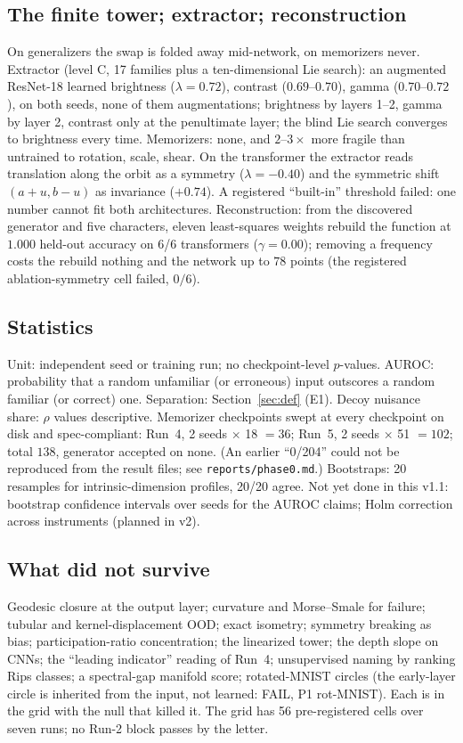 \documentclass[11pt]{article}
\begin{document}
\subsection{The finite tower; extractor; reconstruction}
On generalizers the swap is folded away mid-network, on memorizers never. Extractor (level C, 17 families plus a ten-dimensional Lie search): an augmented ResNet-18 learned brightness ($\lambda=0.72$), contrast ($0.69$--$0.70$), gamma ($0.70$--$0.72$), on both seeds, none of them augmentations; brightness by layers 1--2, gamma by layer 2, contrast only at the penultimate layer; the blind Lie search converges to brightness every time. Memorizers: none, and $2$--$3\times$ more fragile than untrained to rotation, scale, shear. On the transformer the extractor reads translation along the orbit as a symmetry ($\lambda=-0.40$) and the symmetric shift $(a+u,b-u)$ as invariance ($+0.74$). A registered ``built-in'' threshold failed: one number cannot fit both architectures. Reconstruction: from the discovered generator and five characters, eleven least-squares weights rebuild the function at $1.000$ held-out accuracy on 6/6 transformers ($\gamma=0.00$); removing a frequency costs the rebuild nothing and the network up to $78$ points (the registered ablation-symmetry cell failed, $0/6$).

\subsection{Statistics}\label{sec:recon}
Unit: independent seed or training run; no checkpoint-level $p$-values. AUROC: probability that a random unfamiliar (or erroneous) input outscores a random familiar (or correct) one. Separation: Section~\ref{sec:def} (E1). Decoy nuisance share: $\rho$ values descriptive. Memorizer checkpoints swept at every checkpoint on disk and spec-compliant: Run~4, 2 seeds $\times$ 18 $=36$; Run~5, 2 seeds $\times$ 51 $=102$; total $138$, generator accepted on none. (An earlier ``0/204'' could not be reproduced from the result files; see \texttt{reports/phase0.md}.) Bootstraps: 20 resamples for intrinsic-dimension profiles, 20/20 agree. Not yet done in this v1.1: bootstrap confidence intervals over seeds for the AUROC claims; Holm correction across instruments (planned in v2).

\subsection{What did not survive}
Geodesic closure at the output layer; curvature and Morse--Smale for failure; tubular and kernel-displacement OOD; exact isometry; symmetry breaking as bias; participation-ratio concentration; the linearized tower; the depth slope on CNNs; the ``leading indicator'' reading of Run~4; unsupervised naming by ranking Rips classes; a spectral-gap manifold score; rotated-MNIST circles (the early-layer circle is inherited from the input, not learned: FAIL, P1 rot-MNIST). Each is in the grid with the null that killed it. The grid has 56 pre-registered cells over seven runs; no Run-2 block passes by the letter.
\end{document}
